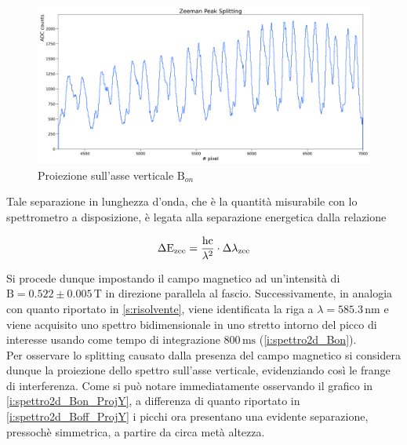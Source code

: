 \documentclass[twocolumn,10pt]{asme2ej}
\begin{document}
\begin{figure}
    \centering
    \includegraphics[width=\textwidth]{../Plots/Bon_Y_proj.png}
    \caption{Proiezione sull'asse verticale $\text{B}_{on}$}
    \label{i:spettro2d_Bon_ProjY}
\end{figure}

\noindent Tale separazione in lunghezza d'onda, che è la quantità misurabile con lo spettrometro a disposizione, è legata alla
separazione energetica dalla relazione

\vspace{-15pt}
\begin{equation}
    \Delta \text{E}_{\text{zee}} = \frac{\text{hc}}{\lambda^2} \cdot \Delta\lambda_{\text{zee}}
    \label{e:dEzee}
\vspace{-5pt}
\end{equation}

Si procede dunque impostando il campo magnetico ad un'intensità di $\text{B} = 0.522 \pm 0.005 \,\si{\tesla}$ in
direzione parallela al fascio. Successivamente, in analogia con quanto riportato in \autoref{s:risolvente}, viene
identificata la riga a $\lambda = 585.3 \,\si{\nano\metre}$ e viene acquisito uno spettro bidimensionale in uno stretto
intorno del picco di interesse usando come tempo di integrazione $800\,\si{\milli\second}$ (\autoref{i:spettro2d_Bon}).
\\
Per osservare lo splitting causato dalla presenza del campo magnetico si considera dunque la proiezione dello spettro
sull'asse verticale, evidenziando così le frange di interferenza. Come si può notare immediatamente osservando il
grafico in \autoref{i:spettro2d_Bon_ProjY}, a differenza di quanto riportato in \autoref{i:spettro2d_Boff_ProjY} i
picchi ora presentano una evidente separazione, pressochè simmetrica, a partire da circa metà altezza. 
\end{document}
